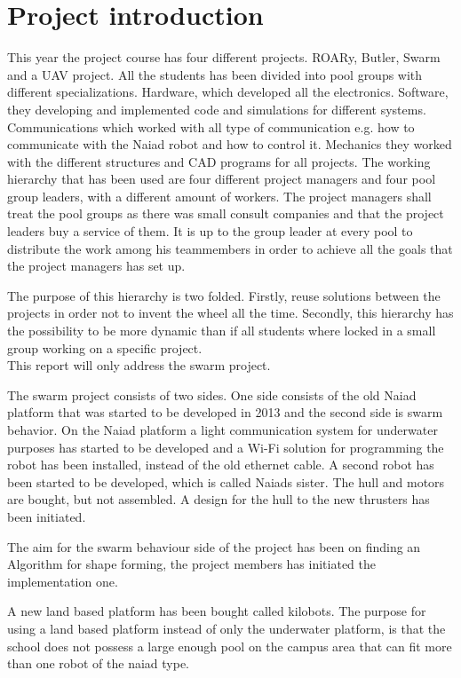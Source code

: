 

\section{Project introduction}
This year the project course has four different projects. ROARy, Butler, Swarm and a UAV project. 
All the students has been divided into pool groups with different specializations. Hardware, which developed all the electronics. Software, they developing and implemented code and simulations for different systems. Communications which worked with all type of communication e.g. how to communicate with the Naiad robot and how to control it. Mechanics they worked with the different structures and CAD programs for all projects.
The working hierarchy that has been used are four different project managers and four pool group leaders, with a different amount of workers. 
The project managers shall treat the pool groups as there was small consult companies and that the project leaders buy a service of them.
It is up to the group leader at every pool to distribute the work among his teammembers in order to achieve all the goals that the project managers has set up.

The purpose of this hierarchy is two folded. Firstly, reuse solutions between the projects in order not to invent the wheel all the time. Secondly, this hierarchy has the possibility to be more dynamic than if all students where locked in a small group working on a specific project.\\

This report will only address the swarm project.

The swarm project consists of two sides. One side consists of the old Naiad platform that was started to be developed in 2013 and the second side is swarm behavior. On the Naiad platform a light communication system for underwater purposes has started to be developed and a Wi-Fi solution for programming the robot has been installed, instead of the old ethernet cable.
A second robot has been started to be developed, which is called Naiads sister. The hull and motors are bought, but not assembled. A design for the hull to the new thrusters has been initiated.

The aim for the swarm behaviour side of the project has been on finding an Algorithm for shape forming, the project members has initiated  the implementation one. 

A new land based platform has been bought called kilobots. The purpose for using a land based platform instead of only the underwater platform, is that the school does not possess a large enough pool on the campus area that can fit more than one robot of the naiad type.

